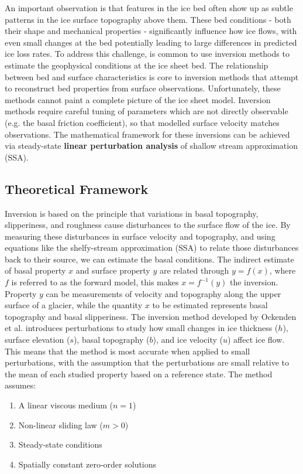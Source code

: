 An important observation is that features in the ice bed often show up as subtle patterns in the ice surface topography above them\cite{Ockenden_2022}. These bed conditions - both their shape and mechanical properties - significantly influence how ice flows, with even small changes at the bed potentially leading to large differences in predicted ice loss rates. To address this challenge, is common to use inversion methods to estimate the geophysical conditions at the ice sheet bed.
The relationship between bed and surface characteristics is core to inversion methods that attempt to reconstruct bed properties from surface observations. Unfortunately, these methods cannot paint a complete picture of the ice sheet model. Inversion methods require careful tuning of parameters which are not directly observable  (e.g. the basal friction coefficient), so that modelled surface velocity matches observations. The mathematical framework for these inversions can be achieved via steady-state \textbf{linear perturbation analysis} of shallow stream approximation (SSA)\cite{Gudmundsson_2008}.

\subsection*{Theoretical Framework}

Inversion is based on the principle that variations in basal topography, slipperiness, and roughness cause disturbances to the surface flow of the ice. By measuring these disturbances in surface velocity and topography, and using equations like the shelfy-stream approximation (SSA) to relate those disturbances back to their source, we can estimate the basal conditions.
The indirect estimate of basal property $x$ and surface property $y$ are related through $y=f(x)$, where $f$ is referred to as the forward model, this makes  $x=f^{-1}(y)$ the inversion. Property $y$ can be measurements of velocity and topography along the upper surface of a glacier, while the quantity $x$ to be estimated represents basal topography and basal slipperiness\cite{Gudmundsson_2008}.
The inversion method developed by Ockenden et al. introduces perturbations to study how small changes in ice thickness ($h$), surface elevation ($s$), basal topography ($b$), and ice velocity ($u$) affect ice flow. This means that the method is most accurate when applied to small perturbations, with the assumption that the perturbations are small relative to the mean of each studied property based on a reference state. The method assumes:
\begin{enumerate}
\item A linear viscous medium ($n=1$)
\item Non-linear sliding law ($m>0$)
\item Steady-state conditions
\item Spatially constant zero-order solutions
\end{enumerate}

